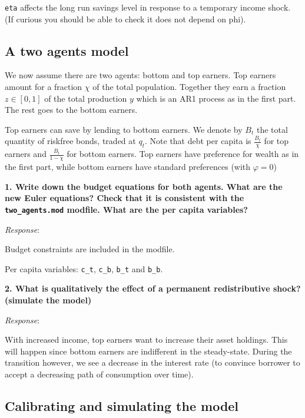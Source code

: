 \documentclass[
  letterpaper,
  DIV=11,
  numbers=noendperiod]{scrartcl}
\begin{document}
\texttt{eta} affects the long run savings level in response to a
temporary income shock. (If curious you should be able to check it does
not depend on phi).

\hypertarget{a-two-agents-model}{%
\subsection{A two agents model}\label{a-two-agents-model}}

We now assume there are two agents: bottom and top earners. Top earners
amount for a fraction \(\chi\) of the total population. Together they
earn a fraction \(z\in[0,1]\) of the total production \(y\) which is an
AR1 process as in the first part. The rest goes to the bottom earners.

Top earners can save by lending to bottom earners. We denote by \(B_t\)
the total quantity of riskfree bonds, traded at \(q_t\). Note that debt
per capita is \(\frac{B_t}{\chi}\) for top earners and
\(\frac{B_t}{1-\chi}\) for bottom earners. Top earners have preference
for wealth as in the first part, while bottom earners have standard
preferences (with \(\varphi=0\))

\textbf{1. Write down the budget equations for both agents. What are the
new Euler equations? Check that it is consistent with the
\texttt{two\_agents.mod} modfile. What are the per capita variables?}

\emph{Response}:

Budget constraints are included in the modfile.

Per capita variables: \texttt{c\_t}, \texttt{c\_b}, \texttt{b\_t} and
\texttt{b\_b}.

\textbf{2. What is qualitatively the effect of a permanent
redistributive shock? (simulate the model)}

\emph{Response}:

With increased income, top earners want to increase their asset
holdings. This will happen since bottom earners are indifferent in the
steady-state. During the transition however, we see a decrease in the
interest rate (to convince borrower to accept a decreasing path of
consumption over time).

\hypertarget{calibrating-and-simulating-the-model}{%
\subsection{Calibrating and simulating the
model}\label{calibrating-and-simulating-the-model}}
\end{document}
